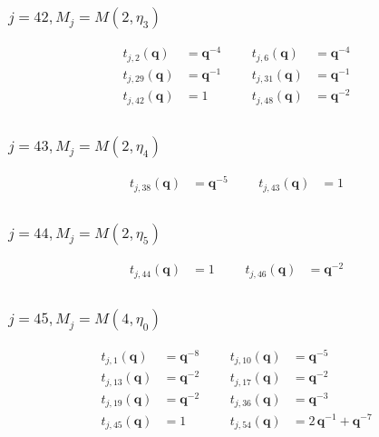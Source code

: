 \subsubsection{$j=42, M_{j}=M(2,\eta_{3})$}
\begin{align*}
t_{j,2}(\boldsymbol{q})&=\boldsymbol{q}^{-4} &&& t_{j,6}(\boldsymbol{q})&=\boldsymbol{q}^{-4} \\
t_{j,29}(\boldsymbol{q})&=\boldsymbol{q}^{-1} &&& t_{j,31}(\boldsymbol{q})&=\boldsymbol{q}^{-1} \\
t_{j,42}(\boldsymbol{q})&=1 &&& t_{j,48}(\boldsymbol{q})&=\boldsymbol{q}^{-2} \\
\end{align*}

\subsubsection{$j=43, M_{j}=M(2,\eta_{4})$}
\begin{align*}
t_{j,38}(\boldsymbol{q})&=\boldsymbol{q}^{-5} &&& t_{j,43}(\boldsymbol{q})&=1 \\
\end{align*}

\subsubsection{$j=44, M_{j}=M(2,\eta_{5})$}
\begin{align*}
t_{j,44}(\boldsymbol{q})&=1 &&& t_{j,46}(\boldsymbol{q})&=\boldsymbol{q}^{-2} \\
\end{align*}

\subsubsection{$j=45, M_{j}=M(4,\eta_{0})$}
\begin{align*}
t_{j,1}(\boldsymbol{q})&=\boldsymbol{q}^{-8} &&& t_{j,10}(\boldsymbol{q})&=\boldsymbol{q}^{-5} \\
t_{j,13}(\boldsymbol{q})&=\boldsymbol{q}^{-2} &&& t_{j,17}(\boldsymbol{q})&=\boldsymbol{q}^{-2} \\
t_{j,19}(\boldsymbol{q})&=\boldsymbol{q}^{-2} &&& t_{j,36}(\boldsymbol{q})&=\boldsymbol{q}^{-3} \\
t_{j,45}(\boldsymbol{q})&=1 &&& t_{j,54}(\boldsymbol{q})&=2\,\boldsymbol{q}^{-1} + \boldsymbol{q}^{-7} \\
\end{align*}

